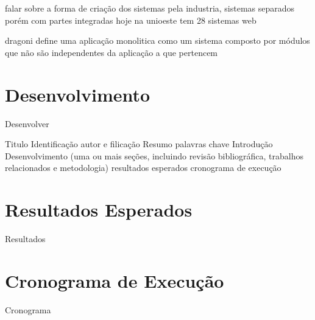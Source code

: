 \documentclass[12pt]{article}
\begin{document}
falar sobre a forma de criação dos sistemas pela industria, sistemas separados porém com partes integradas
hoje na unioeste tem 28 sistemas web

dragoni define uma aplicação monolitica como um sistema composto por módulos que não são independentes da aplicação a que pertencem



\section{Desenvolvimento} \label{sec:firstpage}

Desenvolver

Titulo
Identificação autor e filicação
Resumo
palavras chave
Introdução
Desenvolvimento (uma ou mais seções, incluindo revisão bibliográfica, trabalhos relacionados e metodologia)
resultados esperados
cronograma de execução

\section{Resultados Esperados}

Resultados

\section{Cronograma de Execução}

Cronograma





\end{document}
